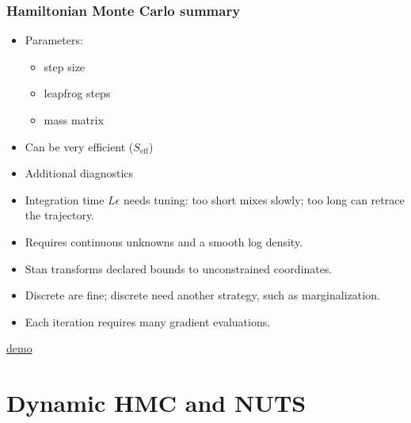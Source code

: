 \documentclass[10pt]{beamer}
\begin{document}
\begin{frame}
\frametitle{Hamiltonian Monte Carlo summary}

\begin{itemize}
\item Parameters:
\begin{itemize}
\item[$\epsilon$] step size \pause
\item[$L$] leapfrog steps\pause
\item[$M$] mass matrix\pause
\end{itemize}
\item[+] Can be very efficient ($S_{\mathrm{eff}}$)
\item[+] Additional diagnostics
\pause
\item[-] Integration time $L\epsilon$ needs tuning: too short mixes slowly;
  too long can retrace the trajectory.
\item Requires continuous unknowns and a smooth log density.
\item Stan transforms declared bounds to unconstrained coordinates.
\item Discrete  are fine; discrete 
  need another strategy, such as marginalization.
\item[-] Each iteration requires many gradient evaluations.
\pause
\end{itemize}

\centering
\href{https://chi-feng.github.io/mcmc-demo/app.html?algorithm=HamiltonianMC&target=standard}{demo}

\end{frame}


\section{Dynamic HMC and NUTS}
\frame{\sectionpage}
\end{document}
